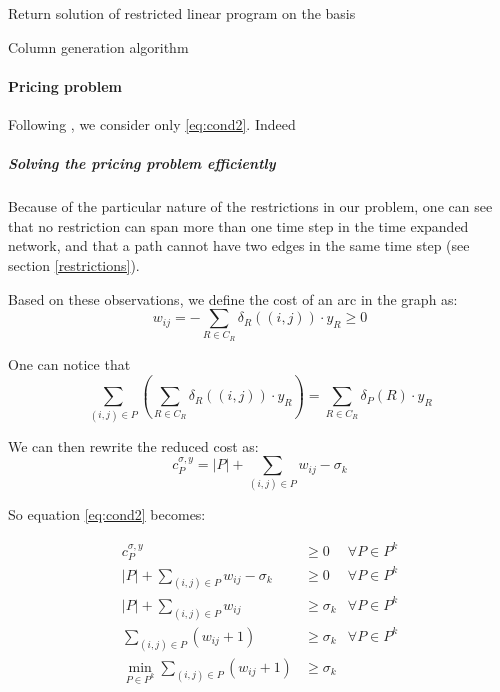 \documentclass[14pt,a4paper]{article}
\theoremstyle{definition}
\numberwithin{equation}{subsection}
\begin{document}
\begin{algorithm}[H]
	\SetAlgoLined


	Return solution of restricted linear program on the basis\;
	
	
	\caption{Column generation algorithm}
\end{algorithm}



\paragraph{Pricing problem}
\label{pricing}

Following \cite[p.~669]{networkflows}, we consider only \eqref{eq:cond2}. Indeed 

\subparagraph{Solving the pricing problem efficiently}
Because of the particular nature of the restrictions in our problem, one can see that no restriction can span more than one time step in the time expanded network, and that a path cannot have two edges in the same time step (see section \ref*{restrictions}). 

Based on these observations, we define the cost of an arc in the graph as:
\begin{equation*}
w_{ij} = -\sum_{R \in C_R} \delta_R((i,j))\cdot y_R \geq 0
\end{equation*}

One can notice that 
$$ \sum_{(i,j)\in P}\left(\sum_{R \in C_R} \delta_R((i,j))\cdot y_R \right)=   \sum\limits_{R \in C_R}    \delta_P(R)\cdot y_R$$



We can then rewrite the reduced cost as: 
$$ c_P^{\sigma,y} = |P| + \sum\limits_{(i,j) \in P}  w_{ij} -\sigma_k $$

So equation \eqref{eq:cond2} becomes:

\begin{eqnarray*}
		c_P^{\sigma,y} & \geq 0 &\forall P \in P^k\\
		|P| + \sum\limits_{(i,j) \in P}  w_{ij} -\sigma_k & \geq 0 &\forall P \in P^k\\
		|P| + \sum\limits_{(i,j) \in P}  w_{ij}  & \geq \sigma_k &\forall P \in P^k\\
		\sum\limits_{(i,j) \in P} \left( w_{ij} + 1\right)  & \geq \sigma_k &\forall P \in P^k\\
		\min_{P\in P^k}\sum\limits_{(i,j) \in P} \left( w_{ij} + 1\right)  & \geq \sigma_k & \\
\end{eqnarray*}
\end{document}
